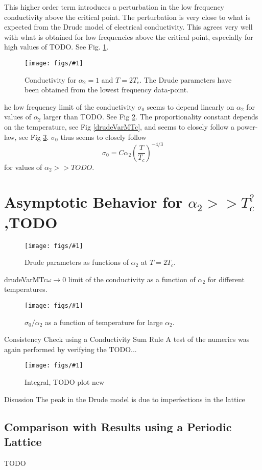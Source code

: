 \documentclass[12pt]{report}
\newcommand{\fig}[3]{
\begin{figure}
\centering
\texttt{[image: figs/\#1]}
\caption{#2}
\end{figure}
}
\begin{document}
This higher order term introduces a perturbation in the low frequency conductivity above the critical point. The perturbation is very close to what is expected from the Drude model of electrical conductivity. 
This agrees very well with what is obtained for low frequencies above the critical point, especially for high values of TODO. See Fig. \ref{drude}.




\fig{drude_2Tc_a21}{Conductivity for $\alpha_2=1$ and $T=2T_c$. The Drude parameters have been obtained from the lowest frequency data-point. \label{drude}}

The low frequency limit of the conductivity $\sigma_0$ seems to depend linearly on $\alpha_2$ for values of $\alpha_2$ larger than TODO. See Fig \ref{drudeVar2Tc}. The proportionality constant depends on the temperature, see Fig \ref{drudeVarMTc}, and seems to closely follow a power-law, see Fig \ref{drudeTdep_1e4}. $\sigma_0$ thus seems to closely follow
\begin{equation}
 \sigma_0=C\alpha_2\left(\frac{T}{T_c}\right)^{-4/3}
\end{equation}
for values of $\alpha_2>>TODO$.


\section{Asymptotic Behavior for $\alpha_2>>T_c^?$,TODO}
\fig{drudeVar2Tc}{Drude parameters as functions of $\alpha_2$ at $T=2T_c$.\label{drudeVar2Tc}}

\fig{drudeVarMTc}{$\omega\rightarrow0$ limit of the conductivity as a function of $\alpha_2$ for different temperatures.\label{drudeVarMTc}}

\fig{drudeTdep_1e4}{$\sigma_0/\alpha_2$ as a function of temperature for large $\alpha_2$.\label{drudeTdep_1e4}}
\section{Consistency Check using a Conductivity Sum Rule}
A test of the numerics was again performed by verifying the TODO...
\fig{sum_rule_a20}{Integral, TODO plot new}

\section{Disussion}
The peak in the Drude model is due to imperfections in the lattice
\subsection{Comparison with Results using a Periodic Lattice}
TODO
\end{document}
